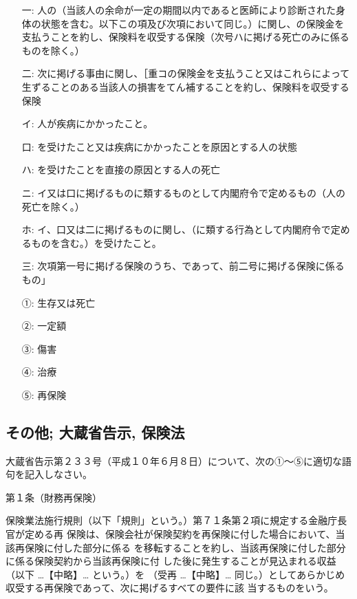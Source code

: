 \documentclass[report,gutter=10mm,fore-edge=10mm,uplatex,dvipdfmx]{jlreq}
\begin{document}
\begin{itemize}
\item[一: ] 人の（当該人の余命が一定の期間以内であると医師により診断された身体の状態を含む。以下この項及び次項において同じ。）に関し、の保険金を支払うことを約し、保険料を収受する保険（次号ハに掲げる死亡のみに係るものを除く。）
\item[二: ] 次に掲げる事由に関し、［重コの保険金を支払うこと又はこれらによって生ずることのある当該人の損害をてん補することを約し、保険料を収受する保険
\item[イ: ] 人が疾病にかかったこと。
\item[口: ] を受けたこと又は疾病にかかったことを原因とする人の状態
\item[ハ: ] を受けたことを直接の原因とする人の死亡
\item[ニ: ] イ又は口に掲げるものに類するものとして内閣府令で定めるもの（人の死亡を除く。）
\item[ホ: ] イ、口又は二に掲げるものに関し、（に類する行為として内閣府令で定めるものを含む。）を受けたこと。
\item[三: ] 次項第一号に掲げる保険のうち、であって、前二号に掲げる保険に係るもの」
\end{itemize}

\answer{}
\begin{itemize}
\item[ ①: ] 生存又は死亡
\item[ ②: ] 一定額
\item[ ③: ] 傷害
\item[ ④: ] 治療
\item[ ⑤: ] 再保険
\end{itemize}



\subsection{その他; 大蔵省告示, 保険法}

大蔵省告示第２３３号（平成１０年６月８日）について、次の①～⑤に適切な語句を記入しなさい。

第１条（財務再保険）

保険業法施行規則（以下「規則」という。）第７１条第２項に規定する金融庁長官が定める再
保険は、保険会社が保険契約を再保険に付した場合において、当該再保険に付した部分に係る
を移転することを約し、当該再保険に付した部分に係る保険契約から当該再保険に付
した後に発生することが見込まれる収益（以下 …【中略】… という。）を
（受再 …【中略】… 同じ。）としてあらかじめ収受する再保険であって、次に掲げるすべての要件に該
当するものをいう。
\end{document}
